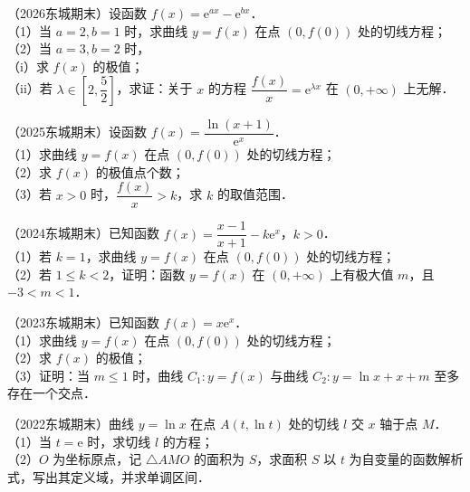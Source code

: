 
\begin{example}
（2026东城期末）设函数 $f(x)=\mathrm{e}^{ax}-\mathrm{e}^{bx}$．\\
（1）当 $a=2,b=1$ 时，求曲线 $y=f(x)$ 在点 $(0,f(0))$ 处的切线方程；\\
（2）当 $a=3,b=2$ 时，\\
（i）求 $f(x)$ 的极值；\\
（ii）若 $\lambda\in\left[2,\dfrac52\right]$，求证：关于 $x$ 的方程 $\dfrac{f(x)}{x}=\mathrm{e}^{\lambda x}$ 在 $(0,+\infty)$ 上无解．
\end{example}

\begin{example}
（2025东城期末）设函数 $f(x)=\dfrac{\ln(x+1)}{\mathrm{e}^x}$．\\
（1）求曲线 $y=f(x)$ 在点 $(0,f(0))$ 处的切线方程；\\
（2）求 $f(x)$ 的极值点个数；\\
（3）若 $x>0$ 时，$\dfrac{f(x)}{x}>k$，求 $k$ 的取值范围．
\end{example}

\begin{example}
（2024东城期末）已知函数 $f(x)=\dfrac{x-1}{x+1}-k\mathrm{e}^x$，$k>0$．\\
（1）若 $k=1$，求曲线 $y=f(x)$ 在点 $(0,f(0))$ 处的切线方程；\\
（2）若 $1\leqslant k<2$，证明：函数 $y=f(x)$ 在 $(0,+\infty)$ 上有极大值 $m$，且 $-3<m<1$．
\end{example}

\begin{example}
（2023东城期末）已知函数 $f(x)=x\mathrm{e}^x$．\\
（1）求曲线 $y=f(x)$ 在点 $(0,f(0))$ 处的切线方程；\\
（2）求 $f(x)$ 的极值；\\
（3）证明：当 $m\leqslant1$ 时，曲线 $C_1:y=f(x)$ 与曲线 $C_2:y=\ln x+x+m$ 至多存在一个交点．
\end{example}

\begin{example}
（2022东城期末）曲线 $y=\ln x$ 在点 $A(t,\ln t)$ 处的切线 $l$ 交 $x$ 轴于点 $M$．\\
（1）当 $t=\mathrm{e}$ 时，求切线 $l$ 的方程；\\
（2）$O$ 为坐标原点，记 $\triangle AMO$ 的面积为 $S$，求面积 $S$ 以 $t$ 为自变量的函数解析式，写出其定义域，并求单调区间．
\end{example}

